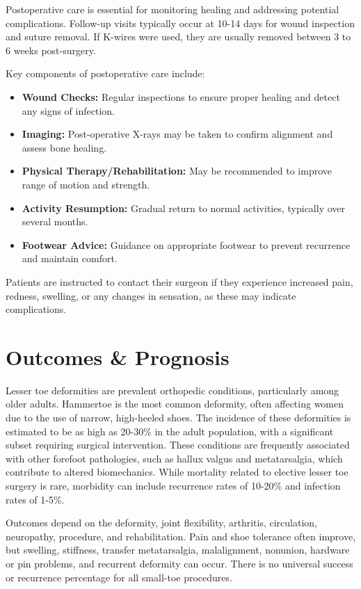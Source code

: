 Postoperative care is essential for monitoring healing and addressing potential complications. Follow-up visits typically occur at 10-14 days for wound inspection and suture removal. If K-wires were used, they are usually removed between 3 to 6 weeks post-surgery.

Key components of postoperative care include:

\begin{itemize}
  \item \textbf{Wound Checks:} Regular inspections to ensure proper healing and detect any signs of infection.
  
  \item \textbf{Imaging:} Post-operative X-rays may be taken to confirm alignment and assess bone healing.
  
  \item \textbf{Physical Therapy/Rehabilitation:} May be recommended to improve range of motion and strength.
  
  \item \textbf{Activity Resumption:} Gradual return to normal activities, typically over several months.
  
  \item \textbf{Footwear Advice:} Guidance on appropriate footwear to prevent recurrence and maintain comfort.
\end{itemize}

Patients are instructed to contact their surgeon if they experience increased pain, redness, swelling, or any changes in sensation, as these may indicate complications.

\section*{Outcomes \& Prognosis}
Lesser toe deformities are prevalent orthopedic conditions, particularly among older adults. Hammertoe is the most common deformity, often affecting women due to the use of narrow, high-heeled shoes. The incidence of these deformities is estimated to be as high as 20-30\% in the adult population, with a significant subset requiring surgical intervention. These conditions are frequently associated with other forefoot pathologies, such as hallux valgus and metatarsalgia, which contribute to altered biomechanics. While mortality related to elective lesser toe surgery is rare, morbidity can include recurrence rates of 10-20\% and infection rates of 1-5\%.

Outcomes depend on the deformity, joint flexibility, arthritis, circulation, neuropathy, procedure, and rehabilitation. Pain and shoe tolerance often improve, but swelling, stiffness, transfer metatarsalgia, malalignment, nonunion, hardware or pin problems, and recurrent deformity can occur. There is no universal success or recurrence percentage for all small-toe procedures.


